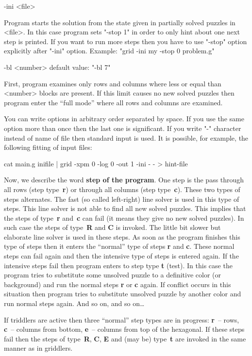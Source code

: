 \para -ini <file>

   Program starts the solution from the state given in partially
   solved puzzles in <file>. In this case program sets 
   "-stop 1" in order to only hint about one next step is printed.
   If you want to run more steps then you have to use
   "-stop" option explicitly after "-ini" option. Example:
   "grid -ini my -stop 0 problem.g"

\para -bl <number>                  default value: "-bl 7"

   First, program examines only rows and columns where less or equal than
   <number> blocks are present. If this limit causes no new solved
   puzzles then program enter the ``full mode'' where all rows and
   columns are examined.

\par\egroup \medskip

You can write options in arbitrary order separated by space.
If you use the same option more than once then the last one 
is significant. If you write "-" character instead of name of file
then standard input is used. It is possible, for example, the
following fitting of input files:

\begtt
cat main.g inifile | grid -xpm 0 -log 0 -out 1 -ini - - > hint-file
\endtt

Now, we describe the word {\bf step of the program}. One step is the
pass through all rows (step type~{\bf r}) or through all columns (step
type~{\bf c}). These two types of steps alternates. The fast (so
called left-right) line solver is used in this type of steps. This
line solver is not able to find all new solved puzzles. This implies
that the steps of type~{\bf r} and~{\bf c} can fail (it means they
give no new solved puzzles). In such case the steps of type~{\bf R}
and {\bf C} is invoked.  The little bit slower but elaborate line solver
is used in these steps.  As soon as the program finishes this type of
steps then it enters the ``normal'' type of steps {\bf r} and {\bf c}. 
These normal steps can fail again and then the intensive type of
steps is entered again. If the intensive steps fail then program enters
to step type {\bf t} (test). In this case the program tries to substitute
some unsolved puzzle to a definitive color (or background) and run the
normal steps {\bf r} or {\bf c} again.  If conflict occurs in this
situation then program tries to substitute unsolved puzzle by another
color and run normal steps again.  And so on, and so on\dots

If triddlers are active then three ``normal'' step types are in progress:
{\bf r}~-- rows, {\bf c}~-- columns from bottom, {\bf e}~-- columns from
top of the hexagonal. If these steps fail then the steps of type~{\bf R},
{\bf C}, {\bf E} and (may be) type~{\bf t} are invoked in the same
manner as in griddlers.


